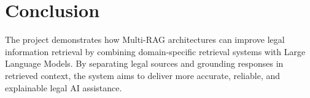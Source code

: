 \documentclass[12pt,a4paper]{article}
\begin{document}
\section{Conclusion}

The project demonstrates how Multi-RAG architectures can improve legal information retrieval by combining domain-specific retrieval systems with Large Language Models. By separating legal sources and grounding responses in retrieved context, the system aims to deliver more accurate, reliable, and explainable legal AI assistance.
\end{document}
